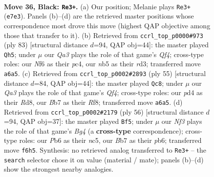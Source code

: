 \documentclass[11pt]{article}
\begin{document}
\clearpage

\begin{figure}[p]\centering
\begin{subfigure}{0.46\textwidth}\centering
\resizebox{\linewidth}{!}{%
\newchessgame
\chessboard[
  setfen={4rk2/1b2rp1P/qp3n2/1N1p2N1/P2P4/5KR1/2Q5/7R b - - 0 36},
  showmover=false,
  pgfstyle=straightmove, color=movearrow, markmove={e7-e3}
]}
\caption{}
\end{subfigure}\hfill
\begin{subfigure}{0.46\textwidth}\centering
\resizebox{\linewidth}{!}{%
\newchessgame
\chessboard[
  setfen={4rrk1/6p1/4b1P1/4Nq2/P1PQ1p2/3R4/5P2/4RK2 b - - 8 42},
  showmover=false,
  pgfstyle=straightmove, color=movearrow, markmove={f5-h5}
]}
\caption{}
\end{subfigure}
\\[4pt]
\begin{subfigure}{0.46\textwidth}\centering
\resizebox{\linewidth}{!}{%
\newchessgame
\chessboard[
  setfen={3r1r1k/1pn1b1pp/2p5/2P2q2/1P2NN2/6P1/Q6P/4RRK1 b - - 5 28},
  showmover=false,
  pgfstyle=straightmove, color=movearrow, markmove={f5-c8}
]}
\caption{}
\end{subfigure}\hfill
\begin{subfigure}{0.46\textwidth}\centering
\resizebox{\linewidth}{!}{%
\newchessgame
\chessboard[
  setfen={4r1k1/2r2p2/pp4b1/2n1q3/3N2B1/Q3P3/P5P1/3R1RK1 w - - 3 29},
  showmover=false,
  pgfstyle=straightmove, color=movearrow, markmove={g4-f5}
]}
\caption{}
\end{subfigure}
\caption{\textbf{Move 36, Black: \texttt{Re3+}.} (a) Our position; Melanie plays \texttt{Re3+} (\texttt{e7e3}). Panels (b)--(d) are the retrieved master positions whose correspondence most drove this move (highest QAP objective among those that transfer to it). (b) Retrieved from \texttt{ccrl\_top\_p0000\#973} (ply 83) [structural distance $d$=94, QAP obj=44]: the master played \texttt{Qh5}; under $\mu$ our \emph{Qa3} plays the role of that game's \emph{Qf4}; cross-type roles: our \emph{N}f6 as their \emph{p}c4, our \emph{n}b5 as their \emph{r}d3; transferred move \texttt{a6a5}. (c) Retrieved from \texttt{ccrl\_top\_p0002\#2893} (ply 55) [structural distance $d$=84, QAP obj=44]: the master played \texttt{Qc8}; under $\mu$ our \emph{Qa3} plays the role of that game's \emph{Qf4}; cross-type roles: our \emph{p}d4 as their \emph{R}d8, our \emph{B}b7 as their \emph{R}f8; transferred move \texttt{a6a5}. (d) Retrieved from \texttt{ccrl\_top\_p0002\#2179} (ply 56) [structural distance $d$=94, QAP obj=37]: the master played \texttt{Bf5}; under $\mu$ our \emph{Nf3} plays the role of that game's \emph{Bg4} (a \textbf{cross-type} correspondence); cross-type roles: our \emph{P}b6 as their \emph{n}c5, our \emph{B}b7 as their \emph{p}b6; transferred move \texttt{f6h5}. Synthesis: no retrieved analog transferred to \texttt{Re3+} -- the \texttt{search} selector chose it on value (material / mate); panels (b)--(d) show the strongest nearby analogies.}
\label{fig:thought-m71}
\end{figure}
\end{document}
